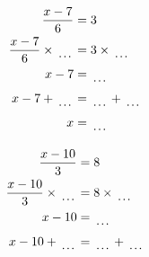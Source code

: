 \documentclass[12pt]{article}
\newcounter{minipagecount}
\begin{document}
\begin{multicols}{2}
\begin{minipage}[t]{0.45\textwidth}
    \raggedright %
    \begin{align*} %
        \frac{x - 7}{6} &= 3\\
        \frac{x - 7}{6} \times\dotuline{\hspace{5mm}} &= 3 \times\dotuline{\hspace{5mm}}\\
        x - 7 &= \dotuline{\hspace{5mm}}\\
        x - 7 + \dotuline{\hspace{5mm}} &= \dotuline{\hspace{5mm}} + \dotuline{\hspace{5mm}}\\
        x &= \dotuline{\hspace{5mm}}\\
    \end{align*}
\end{minipage} %
\noindent{(\theminipagecount)}\hspace{0.1mm} %
\begin{minipage}[t]{0.45\textwidth} %
    \vspace{-26pt}  %
    \raggedright %
    \begin{align*} %
        \frac{x - 10}{3} &= 8\\
        \frac{x - 10}{3} \times\dotuline{\hspace{5mm}} &= 8 \times\dotuline{\hspace{5mm}}\\
        x - 10 &= \dotuline{\hspace{5mm}}\\
        x - 10 + \dotuline{\hspace{5mm}} &= \dotuline{\hspace{5mm}} + \dotuline{\hspace{5mm}}\\

\end{align*}
\end{minipage}
\end{multicols}
\end{document}
